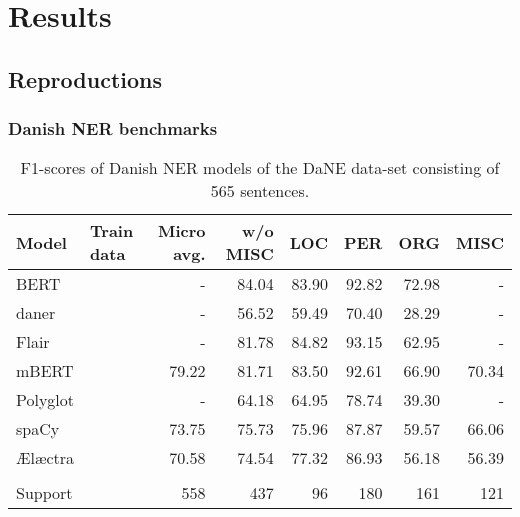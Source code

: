 \documentclass[main.tex]{subfiles}
\begin{document}
\chapter{Results}

\section{Reproductions}
\subsection{Danish NER benchmarks}
\begin{table}[H]
	\begin{center}
		\begin{tabular}{l l r r r r r r}
			Model & Train data & Micro avg. & w/o MISC & LOC & PER & ORG & MISC \\
			\hline
			BERT &  & - & 84.04 & 83.90 & 92.82 & 72.98 & - \\
			daner &  & - & 56.52 & 59.49 & 70.40 & 28.29 & - \\
			Flair &  & - & 81.78 & 84.82 & 93.15 & 62.95 & - \\
			mBERT &  & 79.22 & 81.71 & 83.50 & 92.61 & 66.90 & 70.34 \\
			Polyglot &  & - & 64.18 & 64.95 & 78.74 & 39.30 & - \\
			spaCy &  & 73.75 & 75.73 & 75.96 & 87.87 & 59.57 & 66.06 \\
			Ælæctra &  & 70.58 & 74.54 & 77.32 & 86.93 & 56.18 & 56.39 \\
			 &  &  &  &  &  &  &  \\
			Support &  & 558 & 437 & 96 & 180 & 161 & 121 \\
		\end{tabular}
	\end{center}
	\caption{F1\pro-scores of Danish NER models of the DaNE data-set consisting of 565 sentences.}
	\label{tab:DaNE}
\end{table}
\end{document}

